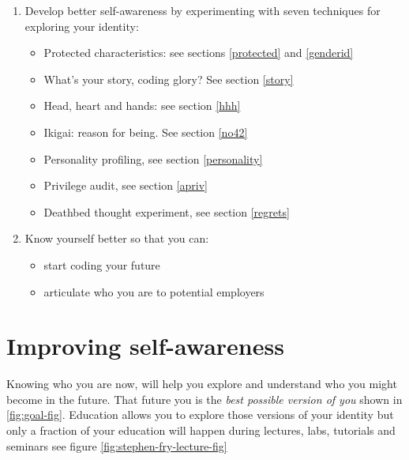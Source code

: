 \documentclass[
]{book}
\providecommand{\tightlist}{%
  \setlength{\itemsep}{0pt}\setlength{\parskip}{0pt}}
\begin{document}
\begin{enumerate}
\def\labelenumi{\arabic{enumi}.}
\tightlist
\item
  Develop better self-awareness by experimenting with seven techniques for exploring your identity:

  \begin{itemize}
  \tightlist
  \item
    Protected characteristics: see sections \ref{protected} and \ref{genderid}
  \item
    What's your story, coding glory? See section \ref{story}
  \item
    Head, heart and hands: see section \ref{hhh}
  \item
    Ikigai: reason for being. See section \ref{no42}
  \item
    Personality profiling, see section \ref{personality}
  \item
    Privilege audit, see section \ref{apriv}
  \item
    Deathbed thought experiment, see section \ref{regrets}
  \end{itemize}
\item
  Know yourself better so that you can:

  \begin{itemize}
  \tightlist
  \item
    start coding your future
  \item
    articulate who you are to potential employers
  \end{itemize}
\end{enumerate}

\hypertarget{skynet}{%
\section{Improving self-awareness}\label{skynet}}

Knowing who you are now, will help you explore and understand who you might become in the future. That future you is the \emph{best possible version of you} shown in \ref{fig:goal-fig}. Education allows you to explore those versions of your identity but only a fraction of your education will happen during lectures, labs, tutorials and seminars see figure \ref{fig:stephen-fry-lecture-fig}
\end{document}
